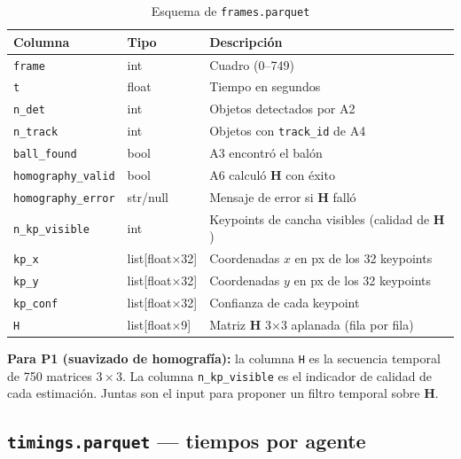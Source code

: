 \documentclass[11pt,a4paper]{article}
\begin{document}
\begin{table}[H]
\centering
\caption{Esquema de \texttt{frames.parquet}}
\label{tab:frames}
\begin{tabular}{lll}
\toprule
\textbf{Columna} & \textbf{Tipo} & \textbf{Descripción} \\
\midrule
\texttt{frame}             & int   & Cuadro (0–749) \\
\texttt{t}                 & float & Tiempo en segundos \\
\texttt{n\_det}            & int   & Objetos detectados por A2 \\
\texttt{n\_track}          & int   & Objetos con \texttt{track\_id} de A4 \\
\texttt{ball\_found}       & bool  & A3 encontró el balón \\
\texttt{homography\_valid} & bool  & A6 calculó $\mathbf{H}$ con éxito \\
\texttt{homography\_error} & str/null & Mensaje de error si $\mathbf{H}$ falló \\
\texttt{n\_kp\_visible}    & int   & Keypoints de cancha visibles (calidad de $\mathbf{H}$) \\
\texttt{kp\_x}             & list[float×32] & Coordenadas $x$ en px de los 32 keypoints \\
\texttt{kp\_y}             & list[float×32] & Coordenadas $y$ en px de los 32 keypoints \\
\texttt{kp\_conf}          & list[float×32] & Confianza de cada keypoint \\
\texttt{H}                 & list[float×9]  & Matriz $\mathbf{H}$ 3×3 aplanada (fila por fila) \\
\bottomrule
\end{tabular}
\end{table}

\begin{notabox}
\textbf{Para P1 (suavizado de homografía):} la columna \texttt{H} es la
secuencia temporal de 750 matrices $3\times3$. La columna \texttt{n\_kp\_visible}
es el indicador de calidad de cada estimación. Juntas son el input para proponer
un filtro temporal sobre $\mathbf{H}$.
\end{notabox}

\subsection{\texttt{timings.parquet} — tiempos por agente}
\end{document}
